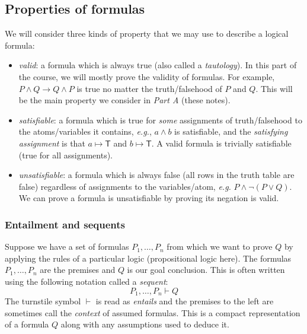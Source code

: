 \documentclass{article}
\theoremstyle{definition}
\newcommand{\eg}{\emph{e.g.}}
\begin{document}
\subsection{Properties of formulas}

We will consider three kinds of property that we may use to describe a logical formula:

\begin{itemize}[leftmargin=1.5em]
  \item \emph{valid}: a formula which is always true (also
  called a \emph{tautology}). In this part of the course, we will
  mostly prove the validity of formulas. For example, $P \wedge Q
  \rightarrow Q \wedge P$ is true no matter the
  truth/falsehood of $P$ and $Q$. This will be the main property we
  consider in \emph{Part A} (these notes).
%
  \item \emph{satisfiable}: a formula which is true for
  \emph{some} assignments of truth/falsehood to the atoms/variables it contains, \eg{},
  $a \wedge b$ is satisfiable, and the \emph{satisfying assignment} is that
  $a \mapsto \mathsf{T}$ and $b \mapsto \mathsf{T}$. A valid formula
  is trivially satisfiable (true for all assignments).
%
  \item \emph{unsatisfiable}: a formula which is always false (all
  rows in the truth table are false) regardless of assignments to the
  variables/atom, \eg{} $P \wedge \neg (P \vee Q)$. We can
  prove a formula is unsatisfiable by proving its negation is valid.
\end{itemize}

\subsubsection{Entailment and sequents}
\label{sec:entailment}

Suppose we have a set of formulas $P_1, \ldots, P_n$ from which we
want to prove $Q$ by applying the rules of a particular logic
(propositional logic here). The formulas $P_1, \ldots, P_n$ are the
premises and $Q$ is our goal conclusion. This is often written using the
following notation called a \emph{sequent}:
%
\begin{equation*}
P_1, \ldots, P_n \vdash Q
\end{equation*}
%
The turnstile symbol $\vdash$ is read as \emph{entails} and the
premises to the left are sometimes call the \emph{context} of assumed
formulas. This is a compact representation of a formula $Q$ along with
any assumptions used to deduce it.
\end{document}
